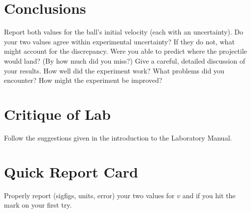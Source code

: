 


\ee

\section*{Conclusions}
Report both values for the ball's initial
velocity (each with an uncertainty).
Do your two values agree within experimental
uncertainty?  If they do not, what might account for the discrepancy.
Were you able to predict where the projectile would land? (By how much
did you miss?)
Give a careful, detailed discussion of
your results.  How well did the experiment work?  What problems did you encounter?
How might the experiment be improved?


\section*{Critique of Lab}

Follow the suggestions given in the introduction to the Laboratory
Manual.

\section*{Quick Report Card}
Properly report (sigfigs, units, error) your two values for $v$
and if you hit the mark on your first try.


